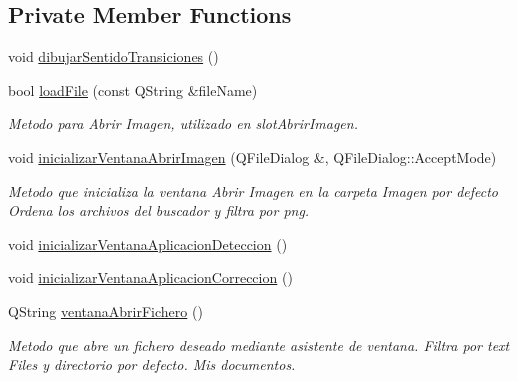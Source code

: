 \subsection*{Private Member Functions}
\begin{DoxyCompactItemize}
\item 
void \hyperlink{classCAplicacion_a2ed9163ef3ad370debed94cca642cb26}{dibujar\+Sentido\+Transiciones} ()
\item 
bool \hyperlink{classCAplicacion_a7802ee67b172b877ddd0f3ac99a7d96e}{load\+File} (const Q\+String \&file\+Name)
\begin{DoxyCompactList}\small\item\em Metodo para Abrir Imagen, utilizado en slot\+Abrir\+Imagen. \end{DoxyCompactList}\item 
void \hyperlink{classCAplicacion_a9d66dd978838dd5b4c99ddb02a9e43a1}{inicializar\+Ventana\+Abrir\+Imagen} (Q\+File\+Dialog \&, Q\+File\+Dialog\+::\+Accept\+Mode)
\begin{DoxyCompactList}\small\item\em Metodo que inicializa la ventana Abrir Imagen en la carpeta Imagen por defecto Ordena los archivos del buscador y filtra por png. \end{DoxyCompactList}\item 
void \hyperlink{classCAplicacion_a08e935c20c9f3d083a10b532641b7457}{inicializar\+Ventana\+Aplicacion\+Deteccion} ()
\item 
void \hyperlink{classCAplicacion_ab10c824290def59c3c6a416119df03ee}{inicializar\+Ventana\+Aplicacion\+Correccion} ()
\item 
Q\+String \hyperlink{classCAplicacion_a66f53bbf6ae42a812a449bd96610e702}{ventana\+Abrir\+Fichero} ()
\begin{DoxyCompactList}\small\item\em Metodo que abre un fichero deseado mediante asistente de ventana. Filtra por text Files y directorio por defecto. Mis documentos. \end{DoxyCompactList}\end{DoxyCompactItemize}
